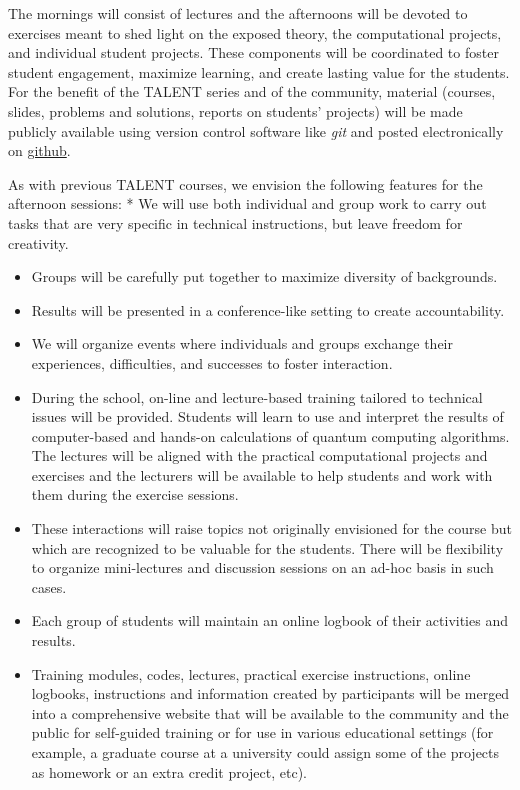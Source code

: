 \documentclass[superscriptaddress,amsmath,amssymb,aps,floatfix]{revtex4-2}
\begin{document}
The mornings will consist of lectures and the afternoons will be devoted
to exercises meant to shed light on the exposed theory, the
computational projects, and individual student projects. These components
will be coordinated to foster student engagement, maximize learning, and
create lasting value for the students. For the benefit of the TALENT
series and of the community, material (courses, slides, problems and
solutions, reports on students' projects) will be made publicly
available using version control software like \emph{git} and posted
electronically on \href{https://github.com}{github}.

As with previous TALENT courses, we envision the following features for
the afternoon sessions: * We will use both individual and group work to
carry out tasks that are very specific in technical instructions, but
leave freedom for creativity.

\begin{itemize}
\item
  Groups will be carefully put together to maximize diversity of
  backgrounds.
\item
  Results will be presented in a conference-like setting to create
  accountability.
\item
  We will organize events where individuals and groups exchange their
  experiences, difficulties, and successes to foster interaction.
\item
  During the school, on-line and lecture-based training tailored to
  technical issues will be provided. Students will learn to use and
  interpret the results of computer-based and hands-on calculations of
  quantum computing algorithms. The lectures will be aligned with the
  practical computational projects and exercises and the lecturers will
  be available to help students and work with them during the exercise
  sessions.
\item
  These interactions will raise topics not originally envisioned for the
  course but which are recognized to be valuable for the students. There
  will be flexibility to organize mini-lectures and discussion sessions
  on an ad-hoc basis in such cases.
\item
  Each group of students will maintain an online logbook of their
  activities and results.
\item
  Training modules, codes, lectures, practical exercise instructions,
  online logbooks, instructions and information created by participants
  will be merged into a comprehensive website that will be available to
  the community and the public for self-guided training or for use in
  various educational settings (for example, a graduate course at a
  university could assign some of the projects as homework or an extra
  credit project, etc).
\end{itemize}
\end{document}

